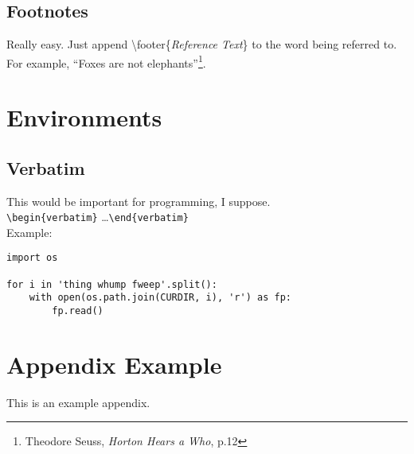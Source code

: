 \documentclass[letterpaper,12pt]{article}
\begin{document}
\subsection{Footnotes}
Really easy. Just append \textbackslash footer\{\emph{Reference Text}\} to the word being referred to. For example,
``Foxes are not elephants''\footnote{Theodore Seuss, \emph{Horton Hears a Who}, p.12}.
\section{Environments}
\subsection{Verbatim}
This would be important for programming, I suppose. \\
\verb|\begin{verbatim}| \ldots \verb|\end{verbatim}| \\
Example: \\
\begin{verbatim}
import os

for i in 'thing whump fweep'.split():
    with open(os.path.join(CURDIR, i), 'r') as fp:
        fp.read()
\end{verbatim}
\clearpage
\appendix
\section{Appendix Example}
This is an example appendix.
\end{document}
